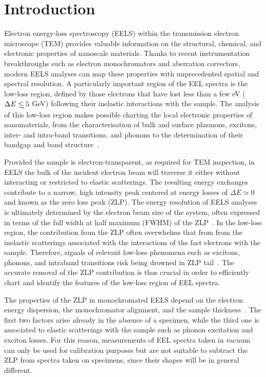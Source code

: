 \section{Introduction}
\label{sec:introduction}

Electron energy-loss spectroscopy (EELS) within the transmission electron microscope (TEM) provides
valuable information on the structural, chemical, and electronic properties of nanoscale materials.
%
Thanks to recent instrumentation breakthroughs
such as electron monochromators and aberration correctors,
modern EELS analyses can map these properties with unprecedented spatial and spectral resolution.
%
A particularly important region of the EEL spectra is
the low-loss region, defined by those electrons that have lost
less than a few eV ($\Delta E\lsim 5$ GeV) following their inelastic interactions
with the sample.
%
The analysis of this low-loss region makes possible charting the local
electronic properties of nanomaterials, from the characterisation of
 bulk and surface plasmons, excitons, inter- and intra-band transitions,
and phonons to
the determination of their bandgap and band structure~\cite{Stoger:2008}.

Provided the sample is electron-transparent, as required for TEM inspection,
in EELS
the bulk of the incident electron beam will traverse it
either without interacting or restricted to elastic scatterings.
%
The resulting energy exchanges contribute to a narrow,
 high intensity peak centered at energy losses
of $\Delta E\simeq 0$ and known as the zero loss peak (ZLP).
%
The energy resolution of EELS analyses is ultimately determined by
the electron beam size of the system, often expressed in terms
of the full width at half maximum (FWHM) of the
ZLP~\cite{Egerton:2009}.
%
In the low-loss region, the contribution from the ZLP
often overwhelms that from 
from the inelastic scatterings associated with the interactions of the fast electrons
with the sample.
%
Therefore, signals of relevant low-loss phenomena such as excitons,
phonons, and intraband transitions risk being drowned
in ZLP tail~\cite{Abajo:2010}.
%
The accurate removal of the ZLP
contribution is thus crucial  in order to efficiently chart and identify the  features
of the low-loss  region of EEL spectra. 

The properties of the ZLP in monochromated EELS depend on the electron energy dispersion,
the monochromator alignment, and the sample thickness~\cite{Park:2008, Stoger:2008}.
%
The first two factors arise already in the absence of a specimen, while the third one is associated
to elastic scatterings with the sample such as  phonon excitation and exciton losses.
%
For this reason, measurements of EEL spectra taken in vacuum can only be used for calibration purposes
but are not suitable
to subtract the ZLP from spectra taken on specimens, since their shapes will be in general
different.

